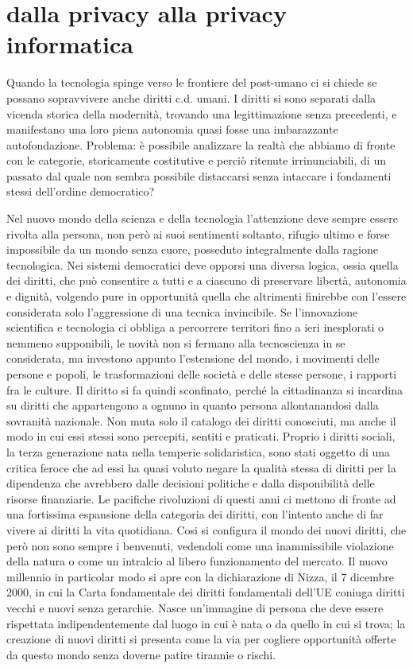 \section{dalla privacy alla privacy informatica}%
Quando la tecnologia spinge verso le frontiere del post-umano ci si chiede se possano sopravvivere anche diritti c.d. umani. I diritti si sono separati dalla vicenda storica della modernità, trovando una legittimazione senza precedenti, e manifestano una loro piena autonomia quasi fosse una imbarazzante autofondazione.
Problema: è possibile analizzare la realtà che abbiamo di fronte con le categorie, storicamente costitutive e perciò ritenute irrinunciabili, di un passato dal quale non sembra possibile distaccarsi senza intaccare i fondamenti stessi dell’ordine democratico? 

Nel nuovo mondo della scienza e della tecnologia l’attenzione deve sempre essere rivolta alla persona, non però ai suoi sentimenti soltanto, rifugio ultimo e forse impossibile da un mondo senza cuore, posseduto integralmente dalla ragione tecnologica. Nei sistemi democratici deve opporsi una diversa logica, ossia quella dei diritti, che può consentire a tutti e a ciascuno di preservare libertà, autonomia e dignità, volgendo pure in opportunità quella che altrimenti finirebbe con l’essere considerata solo l’aggressione di una tecnica invincibile.
Se l’innovazione scientifica e tecnologia ci obbliga a percorrere territori fino a ieri inesplorati o nemmeno supponibili, le novità non si fermano alla tecnoscienza in se considerata, ma investono appunto l’estensione del mondo, i movimenti delle persone e popoli, le trasformazioni delle società e delle stesse persone, i rapporti fra le culture.
Il diritto si fa quindi sconfinato, perché la cittadinanza si incardina su diritti che appartengono a ognuno in quanto persona allontanandosi dalla sovranità nazionale. Non muta solo il catalogo dei diritti conosciuti, ma anche il modo in cui essi stessi sono percepiti, sentiti e praticati. 
Proprio i diritti sociali, la terza generazione nata nella temperie solidaristica, sono stati oggetto di una critica feroce che ad essi ha quasi voluto negare la qualità stessa di diritti per la dipendenza che avrebbero dalle decisioni politiche e dalla disponibilità delle risorse finanziarie.
Le pacifiche rivoluzioni di questi anni ci mettono di fronte ad una fortissima espansione della categoria dei diritti, con l’intento anche di far vivere ai diritti la vita quotidiana.
Cosi si configura il mondo dei nuovi diritti, che però non sono sempre i benvenuti, vedendoli come una inammissibile violazione della natura o come un intralcio al libero funzionamento del mercato. Il nuovo millennio in particolar modo si apre con la dichiarazione di Nizza, il 7 dicembre 2000, in cui la Carta fondamentale dei diritti fondamentali dell’UE coniuga diritti vecchi e nuovi senza gerarchie.
Nasce un’immagine di persona che deve essere rispettata indipendentemente dal luogo in cui è nata o da quello in cui si trova; la creazione di nuovi diritti si presenta come la via per cogliere opportunità offerte da questo mondo senza doverne patire tirannie o rischi.

